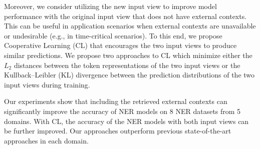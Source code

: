 \documentclass[11pt,a4paper]{article}
\begin{document}
Moreover, we consider utilizing the new input view to improve model performance with the original input view that does not have external contexts. This can be useful in application scenarios when external contexts are unavailable or undesirable (e.g., in time-critical scenarios). To this end, we propose Cooperative Learning (CL) that encourages the two input views to produce similar predictions. We propose two approaches to CL which minimize either the $L_2$ distances between the token representations of the two input views or the Kullback–Leibler (KL) divergence between the prediction distributions of the two input views during training. 

Our experiments show that including the retrieved external contexts can significantly improve the accuracy of NER models on 8 NER datasets from 5 domains. With CL, the accuracy of the NER models with both input views can be further improved. Our approaches outperform previous state-of-the-art approaches in each domain. 
\end{document}

